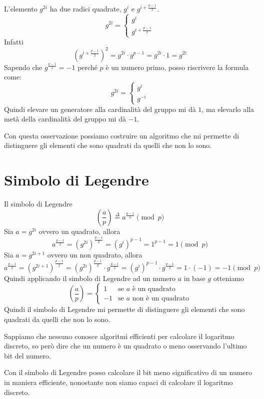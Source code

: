 L'elemento $g^{2i}$ ha due radici quadrate, $g^{i}$ e $g^{i + \frac{p-1}{2}}$.
\[
  g^{2i} =
\begin{cases}
  g^{i} \\
  g^{i + \frac{p-1}{2}} 
\end{cases}
\]
Infatti
\[
  \left( g^{i + \frac{p-1}{2}}\right)^2 = g^{2i}\cdot g^{p-1} = g^{2i} \cdot 1 = g^{2i}
\]
Sapendo che $g^{\frac{p-1}{2}} = -1$ perché $p$ è un numero primo, posso riscrivere la formula come: 
\[
g^{2i} = 
\begin{cases}
  g^{i} \\
  g^{-i}
\end{cases}
\]
Quindi elevare un generatore alla cardinalità del gruppo mi dà $1$, ma 
elevarlo alla metà della cardinalità del gruppo mi dà $-1$.

Con questa osservazione possiamo costruire un algoritmo che mi permette di
distinguere gli elementi che sono quadrati da quelli che non lo sono.

\section{Simbolo di Legendre}
Il simbolo di Legendre
\[
  \left(\frac{a}{p}\right) \stackrel{\Delta}{=}
  a^{\frac{p-1}{a}} \pmod p
\]
Sia $a = g^{2i}$ ovvero un quadrato, allora
\[
  a^{\frac{p-1}{2}}= (g^{2i})^{\frac{p-1}{2}} = (g^{i})^{p-1} = 
  1^{p-1} = 1 \pmod p
\]
Sia $a = g^{2i + 1}$ ovvero un non quadrato, allora
\[
  a^{\frac{p-1}{2}}= (g^{2i + 1})^{\frac{p-1}{2}} = (g^{2i})^{\frac{p-1}{2}}
  \cdot g^{\frac{p-1}{2}} = (g^{i})^{p-1} \cdot g^{\frac{p-1}{2}} = 
  1 \cdot (-1) = -1 \pmod p
\]
Quindi applicando il simbolo di Legendre ad un numero $a$ in base $g$ otteniamo
\[
  \left(\frac{a}{p}\right) = 
  \begin{cases}
    1 & \text{se $a$ è un quadrato} \\
    -1 & \text{se $a$ non è un quadrato}
  \end{cases}
\]
Quindi il simbolo di Legendre mi permette di distinguere gli elementi che sono
quadrati da quelli che non lo sono.

Sappiamo che nessuno conosce algoritmi efficienti per calcolare il
logaritmo discreto, so però dire che un numero è un quadrato o meno osservando 
l'ultimo bit del numero.

Con il simbolo di Legendre posso calcolare il bit meno significativo di un numero
in maniera efficiente, nonostante non siamo capaci di calcolare il logaritmo 
discreto.

